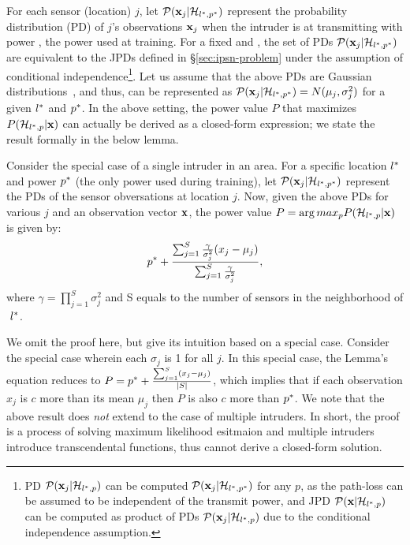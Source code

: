 For each sensor (location) $j$, let $\mathcal{P}(\mathbf{x}_j | \mathcal{H}_{l^*,p^*})$ represent the
probability distribution (PD) of $j$'s observations $\mathbf{x}_j$ when the
intruder is at \lstar transmitting with power \pstar, the power used
at training.
For a fixed \lstar and \pstar, the set of PDs $\mathcal{P}(\mathbf{x}_j | \mathcal{H}_{l^*,p^*})$ are
equivalent to the JPDs defined in \S\ref{sec:ipsn-problem} under the
assumption of conditional independence\footnote{PD $\mathcal{P}(\mathbf{x}_j |
  \mathcal{H}_{l^*,p})$ can be computed $\mathcal{P}(\mathbf{x}_j | \mathcal{H}_{l^*,p^*})$ for any $p$, as the
  path-loss can be assumed to be independent of the transmit power,
  and JPD $\mathcal{P}(\mathbf{x} | \mathcal{H}_{l^*,p})$ can be computed as product of PDs
  $\mathcal{P}(\mathbf{x}_j | \mathcal{H}_{l^*,p})$ due to the conditional independence assumption.}.
Let us assume that the above PDs are Gaussian
distributions~\cite{gauss}, and thus, can be represented as $\mathcal{P}(\mathbf{x}_j
| \mathcal{H}_{l^*,p^*}) = N(\mu_j, \sigma_j^2)$ for a given $l^*$ and $p^*$.
In the above setting, the power value $P$ that maximizes $P(\mathcal{H}_{l^*,p} | \mathbf{x})$
can actually be derived as a closed-form expression; we state the result
formally in the below lemma. 
\begin{lemma-wo-prf}
  Consider the special case of a single intruder in an area.  For a
  specific location $l^*$ and power $p^*$ (the only power used
  during training), let $\mathcal{P}(\mathbf{x}_j | \mathcal{H}_{l^*,p^*})$ represent the PDs of the
  sensor obversations at location $j$. Now, given the above PDs for
  various $j$ and an observation vector $\mathbf{x}$, the power value
  $P = \arg max_p P(\mathcal{H}_{l^*,p} | \mathbf{x})$ is   given by: 
  $$p^* + \frac{\sum_{j=1}^{S} \frac{\gamma}{\sigma_j^2}(x_j - \mu_j)}{\sum_{j=1}^{S} \frac{\gamma}{\sigma_j^2}},$$
  where $\gamma = \prod_{j=1}^{S} \sigma_j^2$ and S equals to the number of sensors in the neighborhood of  $\ l^*$.
  \label{lem:p}
\end{lemma-wo-prf}
We omit the proof here, but give its intuition based on a special
case. Consider the special case wherein each $\sigma_j$ is 1 for all
$j$. In this special case, the Lemma's equation reduces to $P = p^*
+ \frac{\sum_{j=1}^{S}(x_j - \mu_j)}{|S|}$, which implies that if each
observation $x_j$ is $c$ more than its mean $\mu_j$ then $P$ is also
$c$ more than $p^*$. We note that the above result does {\em not}
extend to the case of multiple intruders. In short, the proof is a process of solving maximum likelihood esitmaion and multiple intruders introduce transcendental functions, thus cannot derive a closed-form solution.


